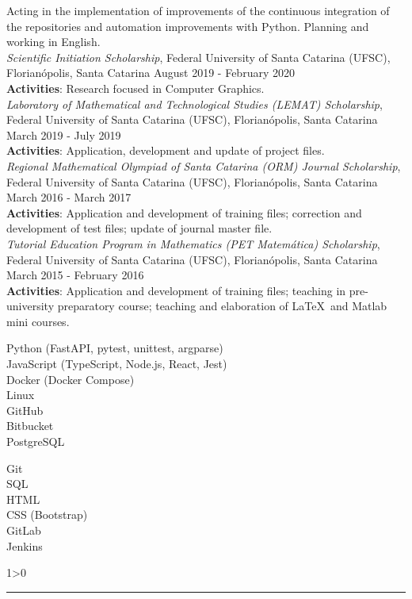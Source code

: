 \documentclass[a4paper,10pt]{article}
\newcommand{\createSection}[4][0]{
	\begin{tcolorbox}[
        blanker,
        breakable,
        title=\begin{minipage}{0.16\linewidth}\large{\textbf{#2}}\vspace{-#3\baselineskip}\end{minipage},
        coltitle=black,
        leftupper=0.21\linewidth,
    ]
        #4
		\ifnum0#1>0 { \hrule {\ } } \fi
    \end{tcolorbox}
}
\begin{document}
{        Acting in the implementation of improvements of the continuous integration of the repositories and automation improvements with Python. Planning and working in English.\\

	    \textit{Scientific Initiation Scholarship}, Federal University of Santa Catarina (UFSC), Florianópolis, Santa Catarina \hfill August 2019 - February 2020 \\
		\textbf{Activities}: Research focused in Computer Graphics.\\

		\textit{Laboratory of Mathematical and Technological Studies (LEMAT) Scholarship}, Federal University of Santa Catarina (UFSC), Florianópolis, Santa Catarina \hfill March 2019 - July 2019 \\
		\textbf{Activities}: Application, development and update of project files.\\

		\textit{Regional Mathematical Olympiad of Santa Catarina (ORM) Journal Scholarship}, Federal University of Santa Catarina (UFSC), Florianópolis, Santa Catarina \hfill March 2016 - March 2017 \\
		\textbf{Activities}: Application and development of training files; correction and development of test files; update of journal master file.\\

		\textit{Tutorial Education Program in Mathematics (PET Matemática) Scholarship}, Federal University of Santa Catarina (UFSC), Florianópolis, Santa Catarina \hfill March 2015 - February 2016 \\
		\textbf{Activities}: Application and development of training files; teaching in pre-university preparatory course; teaching and elaboration of \LaTeX\ and Matlab mini courses.\\
	}

    \createSection[1]{Programming languages and tools}{4}{
        \large{\bf
			\begin{minipage}{0.65\linewidth}
				Python (FastAPI, pytest, unittest, argparse)\\
				JavaScript (TypeScript, Node.js, React, Jest)\\
				Docker (Docker Compose)\\
				Linux\\
				GitHub\\
				Bitbucket\\
				PostgreSQL\\
			\end{minipage}
			\begin{minipage}{0.35\linewidth}
				Git\\
				SQL\\
				HTML\\
				CSS (Bootstrap)\\
				GitLab\\
				Jenkins\\
				\vspace{\baselineskip}
			\end{minipage}
		}
    }
\end{document}
